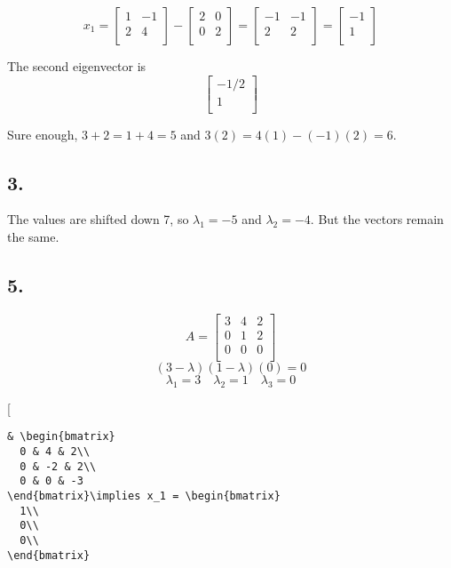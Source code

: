 \documentclass[
]{article}
\begin{document}
\[x_1 = \begin{bmatrix}
  1 & -1\\
  2 & 4\\
\end{bmatrix} - \begin{bmatrix}
  2 & 0\\
  0 & 2\\
\end{bmatrix}  = \begin{bmatrix}
  -1 & -1\\
  2  & 2\\
\end{bmatrix} = \begin{bmatrix}
  -1\\
  1\\
\end{bmatrix}\]

The second eigenvector is\[\begin{bmatrix}
  -1/2\\
  1\\
\end{bmatrix}\]

Sure enough, \(3+2 =1 +4=5\) and \(3(2) =4(1) - (-1)(2)=6\).

\hypertarget{section-1}{%
\subsection{3.}\label{section-1}}

The values are shifted down 7, so \(\lambda_1 = -5\) and
\(\lambda_2= -4\). But the vectors remain the same.

\hypertarget{section-2}{%
\subsection{5.}\label{section-2}}

\[A = \begin{bmatrix}
  3 & 4 & 2\\
  0 & 1 & 2\\
  0 & 0 & 0\\
\end{bmatrix}\] \[(3-\lambda)(1 -\lambda)(0) = 0\]
\[\lambda_1 = 3\quad\lambda_2 =1\quad\lambda_3 = 0 \]

{[}

\begin{verbatim}
& \begin{bmatrix}
  0 & 4 & 2\\
  0 & -2 & 2\\
  0 & 0 & -3
\end{bmatrix}\implies x_1 = \begin{bmatrix}
  1\\
  0\\
  0\\
\end{bmatrix}
\end{verbatim}
\end{document}
